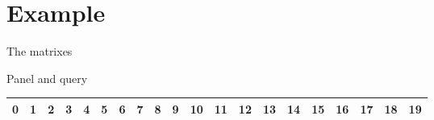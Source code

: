 \documentclass{beamer}
\begin{document}
\section{Example}
\begin{frame}{The matrixes}
  \begin{block}{Panel and query}
    \begin{table}[H]
      \centering
      \tiny
      \begin{tabular}{c|c|c|c|c|c|c|c|c|c|c|c|c|c|c|c|c|c|c|c}
                    \hline
                    0 & 1 & 2 & 3 & 4 & 5 & 6 & 7 & 8 & 9 & 10 & 11 & 12 & 13 & 14 & 15 & 16
                                                                                                      & 17 & 18 & 19\\
                    \hline
                    \hline


\end{tabular}
\end{table}
\end{block}
\end{frame}
\end{document}
